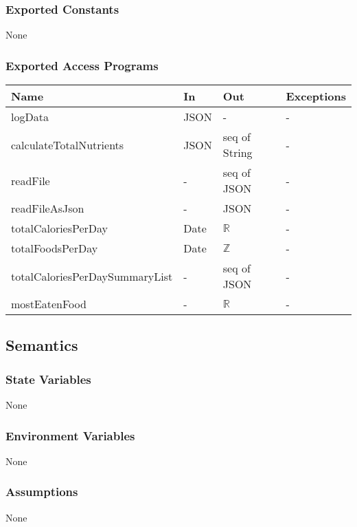 \documentclass[12pt, titlepage]{article}
\begin{document}
\subsubsection{Exported Constants}
None
\subsubsection{Exported Access Programs}
\begin{center}
	\begin{tabular}{p{6.2cm} p{5cm} p{2.5cm} p{2cm}}
		\hline
		\textbf{Name} & \textbf{In} & \textbf{Out} & \textbf{Exceptions} \\
		\hline
		
		logData & JSON  & - & - \\
		calculateTotalNutrients & JSON  & seq of String & - \\
		readFile & -  & seq of JSON & - \\
		readFileAsJson & -  & JSON & - \\
		totalCaloriesPerDay & Date  & $\mathbb{R}$ & - \\
		totalFoodsPerDay & Date  & $\mathbb{Z}$ & - \\
		totalCaloriesPerDaySummaryList & -  & seq of JSON & - \\
		mostEatenFood & -  & $\mathbb{R}$ & - \\
		\hline
	\end{tabular}
\end{center}
\subsection{Semantics}
\subsubsection{State Variables}
None
\subsubsection{Environment Variables}
None
\subsubsection{Assumptions}
None
\end{document}
